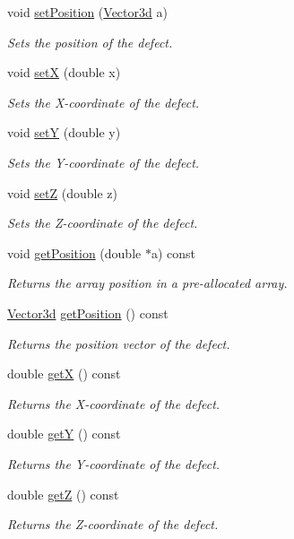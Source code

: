 \begin{DoxyCompactItemize}
void \hyperlink{classDefect_a36ffa9b4b01d38ed8a95ca2c78973cc4}{set\-Position} (\hyperlink{classVector3d}{Vector3d} a)
\begin{DoxyCompactList}\small\item\em Sets the position of the defect. \end{DoxyCompactList}\item 
void \hyperlink{classDefect_a5a65f73da6a572d9e7109b31239e441d}{set\-X} (double x)
\begin{DoxyCompactList}\small\item\em Sets the X-\/coordinate of the defect. \end{DoxyCompactList}\item 
void \hyperlink{classDefect_a268606391a4eaee3de029d2005648b6f}{set\-Y} (double y)
\begin{DoxyCompactList}\small\item\em Sets the Y-\/coordinate of the defect. \end{DoxyCompactList}\item 
void \hyperlink{classDefect_abb0b16c44a1b04d782f5c5f598b49d5b}{set\-Z} (double z)
\begin{DoxyCompactList}\small\item\em Sets the Z-\/coordinate of the defect. \end{DoxyCompactList}\item 
void \hyperlink{classDefect_a2bfcc6736a19eb9c4c8803ea0ea1e3f7}{get\-Position} (double $\ast$a) const 
\begin{DoxyCompactList}\small\item\em Returns the array position in a pre-\/allocated array. \end{DoxyCompactList}\item 
\hyperlink{classVector3d}{Vector3d} \hyperlink{classDefect_ad175c3f2b1fad6be48806dab69dfb32e}{get\-Position} () const 
\begin{DoxyCompactList}\small\item\em Returns the position vector of the defect. \end{DoxyCompactList}\item 
double \hyperlink{classDefect_a6e331ddeabd92e2edc124e6697d3bf7d}{get\-X} () const 
\begin{DoxyCompactList}\small\item\em Returns the X-\/coordinate of the defect. \end{DoxyCompactList}\item 
double \hyperlink{classDefect_ae307725c160984f44832fce5af896789}{get\-Y} () const 
\begin{DoxyCompactList}\small\item\em Returns the Y-\/coordinate of the defect. \end{DoxyCompactList}\item 
double \hyperlink{classDefect_a56e4a61e93d01dd765a921e3828af6c4}{get\-Z} () const 
\begin{DoxyCompactList}\small\item\em Returns the Z-\/coordinate of the defect. \end{DoxyCompactList}\end{DoxyCompactItemize}
